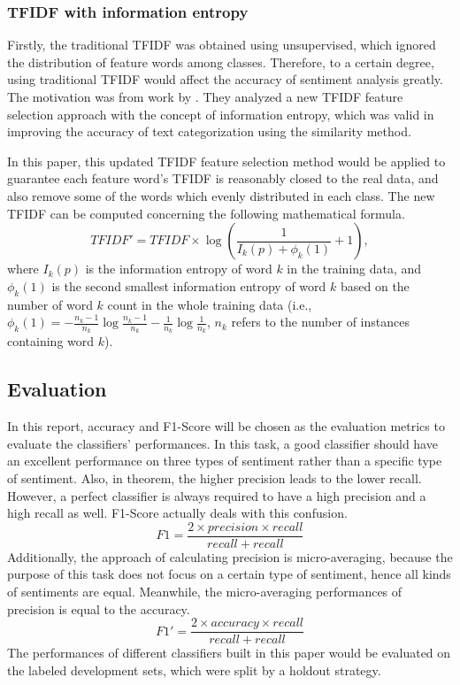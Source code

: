 \documentclass[11pt]{article}
\begin{document}
\subsubsection{TFIDF with information entropy}
Firstly, the traditional TFIDF was obtained using unsupervised, which ignored the distribution of feature words among classes. Therefore, to a certain degree, using traditional TFIDF would affect the accuracy of sentiment analysis greatly. The motivation was from work by \cite{Zhou2007}. They analyzed a new TFIDF feature selection approach with the concept of information entropy, which  was valid in improving the accuracy of text categorization using the similarity method.  

In this paper, this updated TFIDF feature selection method would be applied to guarantee each feature word's TFIDF is reasonably closed to the real data, and also remove some of the words which evenly distributed in each class. The new TFIDF can be computed concerning the following mathematical formula.
$$TFIDF' = TFIDF \times \log (\frac{1}{I_k(p)+\phi_k(1)}+1),$$
 where $I_k(p)$ is the information entropy of word $k$ in the training data, and $\phi_k(1)$ is the second smallest information entropy of word $k$ based on the number of word $k$ count in the whole training data (i.e., $\phi_k(1)=-\frac{n_k-1}{n_k}\log\frac{n_k-1}{n_k}-\frac{1}{n_k}\log\frac{1}{n_k}$, $n_k$ refers to the number of instances containing word $k$). 
 

\subsection{Evaluation}
In this report,  accuracy and F1-Score will be chosen as the evaluation metrics to evaluate the classifiers' performances. In this task, a good classifier should have an excellent performance on three types of sentiment rather than a specific type of sentiment. Also, in theorem, the higher precision leads to the lower recall. However, a perfect classifier is always required to have a high precision and a high recall as well. F1-Score actually deals with this confusion. 
$$F1 = \frac{2\times precision\times recall}{recall+recall}$$
Additionally, the approach of calculating precision is micro-averaging, because the purpose of this task does not focus on a certain type of sentiment, hence all kinds of sentiments are equal. Meanwhile, the micro-averaging performances of precision is equal to the accuracy. 
$$F1' =\frac{2\times accuracy\times recall}{recall+recall}$$
The performances of different classifiers built in this paper would be evaluated on the labeled development sets, which were split by a holdout strategy.
\end{document}
